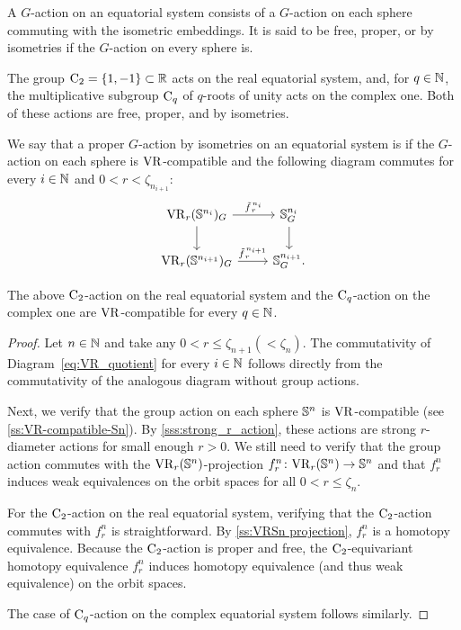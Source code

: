 \subsubsection{}\label{ss:system VR compatible}

A \(G\)-action on an equatorial system consists of a \(G\)-action on each sphere commuting with the isometric embeddings.
It is said to be free, proper, or by isometries if the \(G\)-action on every sphere is.

The group \(\mathrm{C}_2 = \{1,-1\} \subset \mathbb{R}\) acts on the real equatorial system, and, for \(q \in \mathbb{N}\), the multiplicative subgroup \(\mathrm{C}_q\) of \(q\)-roots of unity acts on the complex one.
Both of these actions are free, proper, and by isometries.

We say that a proper \(G\)-action by isometries on an equatorial system is  if the \(G\)-action on each sphere is \(\mathrm{VR}\)-compatible and the following diagram commutes for every \(i \in \mathbb{N}\) and $0 < r < \zeta_{n_{i+1}}$: 
\begin{equation}\label{eq:VR_quotient}
    \begin{tikzcd}
	\VR_r(\bS^{n_i})_G
	\ar[d]
	\ar[r, "\tilde f_{\,r}^{\,n_i}" above]
	&
	\bS^{n_i}_G
	\ar[d]
	\\
	\VR_r(\bS^{n_{i+1}})_G
	\ar[r, "\tilde f_{\,r}^{\,n_{i+1}}" above]
	&
	\bS^{n_{i+1}}_G.
\end{tikzcd}
\end{equation}

\lemma The above \(\mathrm{C}_2\)-action on the real equatorial system and the \(\mathrm{C}_q\)-action on the complex one are \(\mathrm{VR}\)-compatible for every \(q \in \mathbb{N}\).

\begin{proof}
    Let $n \in \mathbb{N}$ and take any $0 < r \leq \zeta_{n+1} (< \zeta_{n})$.
    The commutativity of Diagram~\ref{eq:VR_quotient} for every $i \in \mathbb{N}$ follows directly from the commutativity of the analogous diagram without group actions.

    Next, we verify that the group action on each sphere $\mathbb{S}^n$ is \(\mathrm{VR}\)-compatible (see \cref{ss:VR-compatible-Sn}).
    By \cref{sss:strong_r_action}, these actions are strong \(r\)-diameter actions for small enough $r>0$.
    We still need to verify that the group action commutes with the $\mathrm{VR}_r(\mathbb{S}^{n})$-projection $f_r^{n}\colon \mathrm{VR}_r(\mathbb{S}^{n}) \to \mathbb{S}^{n}$ and that $f_r^{n}$ induces weak equivalences on the orbit spaces for all $0 < r \leq \zeta_{n}$.

    For the $\mathrm{C}_2$-action on the real equatorial system, verifying that the $\mathrm{C}_2$-action commutes with $f_r^{n}$ is straightforward.
    By \cref{ss:VRSn projection}, $f_r^{n}$ is a homotopy equivalence.
    Because the $\mathrm{C}_2$-action is proper and free, the $\mathrm{C}_2$-equivariant homotopy equivalence $f_r^n$ induces homotopy equivalence (and thus weak equivalence) on the orbit spaces.

    The case of $\mathrm{C}_q$-action on the complex equatorial system follows similarly.
\end{proof}

